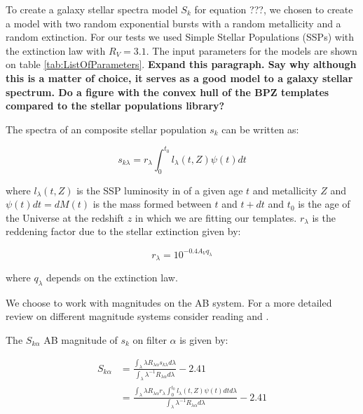 \documentclass[a4paper, useAMS, usenatbib, hyperpdf]{mn2e}
\begin{document}
To create a galaxy stellar spectra model $S_k$ for equation ???, we chosen to create a model with two random exponential bursts with a random metallicity and a random extinction. For our tests we used \cite{Bruzual.Charlot.2003a} Simple Stellar Populations (SSPs) with the \cite{Cardelli.Clayton.Mathis.1989a} extinction law with $R_V = 3.1$. The input parameters for the models are shown on table \ref{tab:ListOfParameters}. {\bf Expand this paragraph. Say why although this is a matter of choice, it serves as a good model to a galaxy stellar spectrum. Do a figure with the convex hull of the BPZ templates compared to the stellar populations library?}

The spectra of an composite stellar population $s_k$ can be written as:

\begin{equation}
\label{eq:csp_spec}
s_{k \lambda} =  r_\lambda \int_0^{t_0} l_\lambda (t, Z) \psi (t) dt
\end{equation}

where $l_\lambda(t, Z)$ is the SSP luminosity in of a given age $t$ and metallicity $Z$ and $\psi(t) dt = dM(t)$ is the mass formed between $t$ and $t + dt$ and $t_0$ is the age of the Universe at the redshift $z$ in which we are fitting our templates. $r_\lambda$ is the reddening factor due to the stellar extinction given by:

\begin{equation}
\label{eq:red_term}
r_\lambda = 10^{-0.4 A_V q_\lambda}
\end{equation}

where $q_\lambda$ depends on the extinction law. 

We choose to work with magnitudes on the AB system. For a more detailed review on different magnitude systems consider reading \cite{Casagrande.VandenBerg.2014a} and \cite{Blanton.etal.2003c}.

The $S_{k \alpha}$ AB magnitude of $s_k$ on filter $\alpha$ is given by:

\begin{equation}
\label{eq:mag_filter}
\begin{split}
S_{k \alpha} & = \frac{\int_\lambda \lambda R_{\lambda \alpha} s_{k \lambda} d\lambda}{\int_\lambda \lambda^{-1} R_{\lambda \alpha}  d\lambda}  - 2.41 \\
& = \frac{\int_\lambda \lambda  R_{\lambda \alpha}  r_\lambda \int_0^{t_0} l_\lambda (t, Z) \psi (t) dt d\lambda}{\int_\lambda \lambda^{-1} R_{\lambda \alpha} d\lambda} - 2.41
\end{split}
\end{equation}
\end{document}
